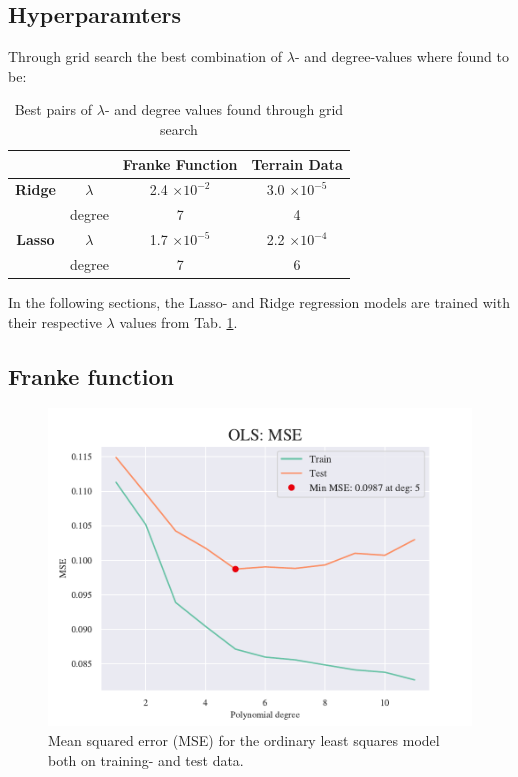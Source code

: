 \subsection{Hyperparamters}

Through grid search the best combination of $\lambda$- and degree-values where found to be: 

\begin{table}[h!]
    \centering
    \begin{tabular}{|c|c|c|c|}
        \hline
        & & \textbf{Franke Function} & \textbf{Terrain Data} \\ \hline
        \textbf{Ridge} & $\lambda$ & 2.4 $\times 10^{-2}$ & 3.0 $\times 10^{-5}$ \\ 
         & degree & 7 & 4 \\ \hline
        \textbf{Lasso} & $\lambda$ & 1.7 $\times 10^{-5}$ & 2.2 $\times 10^{-4}$ \\ 
         & degree & 7 & 6 \\ \hline
    \end{tabular}
    \caption{Best pairs of $\lambda$- and degree values found through grid search}
    \label{tab:grid}
\end{table}

In the following sections, the Lasso- and Ridge regression models are trained with their respective $\lambda$ values from Tab. \ref{tab:grid}. 

\subsection{Franke function}

\begin{figure}[h!]
    \centering
    \includegraphics[width=1\linewidth]{project_1/figures/figures_in_report/OLS_MSE_Franke_Noise.pdf}
    \caption{Mean squared error (MSE) for the ordinary least squares model both on training- and test data. }
    \label{fig:mseols}
\end{figure}

